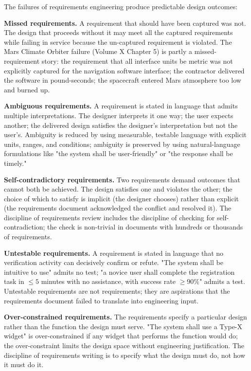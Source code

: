 The failures of requirements engineering produce predictable design outcomes:

\textbf{Missed requirements.} A requirement that should have been captured was not. The design that proceeds without it may meet all the captured requirements while failing in service because the un-captured requirement is violated. The Mars Climate Orbiter failure (Volume X Chapter 5) is partly a missed-requirement story: the requirement that all interface units be metric was not explicitly captured for the navigation software interface; the contractor delivered the software in pound-seconds; the spacecraft entered Mars atmosphere too low and burned up.

\textbf{Ambiguous requirements.} A requirement is stated in language that admits multiple interpretations. The designer interprets it one way; the user expects another; the delivered design satisfies the designer's interpretation but not the user's. Ambiguity is reduced by using measurable, testable language with explicit units, ranges, and conditions; ambiguity is preserved by using natural-language formulations like "the system shall be user-friendly" or "the response shall be timely."

\textbf{Self-contradictory requirements.} Two requirements demand outcomes that cannot both be achieved. The design satisfies one and violates the other; the choice of which to satisfy is implicit (the designer chooses) rather than explicit (the requirements document acknowledged the conflict and resolved it). The discipline of requirements review includes the discipline of checking for self-contradiction; the check is non-trivial in documents with hundreds or thousands of requirements.

\textbf{Untestable requirements.} A requirement is stated in language that no verification activity can decisively confirm or refute. "The system shall be intuitive to use" admits no test; "a novice user shall complete the registration task in $\leq 5$ minutes with no assistance, with success rate $\geq 90\%$" admits a test. Untestable requirements are not requirements; they are aspirations that the requirements document failed to translate into engineering input.

\textbf{Over-constrained requirements.} The requirements specify a particular design rather than the function the design must serve. "The system shall use a Type-X widget" is over-constrained if any widget that performs the function would do; the over-constraint limits the design space without engineering justification. The discipline of requirements writing is to specify what the design must do, not how it must do it.


